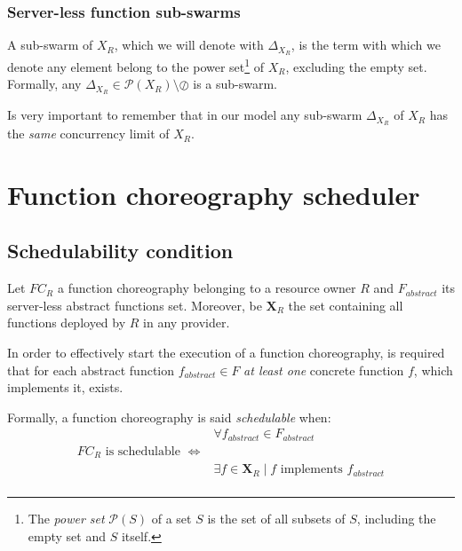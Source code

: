 \documentclass[10pt,a4paper]{article}
\theoremstyle{definition}
\begin{document}
\subsubsection{Server-less function sub-swarms}

A sub-swarm of ${X_{R}}$, which we will denote with $\Delta_{X_{R}}$, is the term with which we denote any element belong to the power set\footnote{The \textit{power set} $\mathcal{P}(S)$ of a set $S$ is the set of all subsets of $S$, including the empty set and $S$ itself.} of $X_{R}$, excluding the empty set. Formally, any $\Delta_{X_{R}} \in \mathcal{P}(X_{R}) \setminus \oslash$ is a sub-swarm.

Is very important to remember that in our model any sub-swarm $\Delta_{X_{R}}$ of ${X_{R}}$ has the \textit{same} concurrency limit of ${X_{R}}$.

\section{Function choreography scheduler}

\subsection{Schedulability condition}

Let $FC_R$ a function choreography belonging to a resource owner $R$ and $F_{abstract}$ its server-less abstract functions set. Moreover, be $\textbf{X}_R$ the set containing all functions deployed by $R$ in any provider.

In order to effectively start the execution of a function choreography, is required that for each abstract function $f_{abstract} \in F$ \textit{at least one} concrete function $f$, which implements it, exists.

Formally, a function choreography is said \textit{schedulable} when: 
\begin{equation}
\label{eqn:SchedulabilityConditionOne}
\begin{array}{lc}

& \forall f_{abstract} \in F_{abstract} \\

FC_R \text{ is schedulable } \Leftrightarrow & \\
 & \exists f \in \textbf{X}_R \mid  f \text{ implements } f_{abstract} \\
\end{array}
\end{equation}
\end{document}
